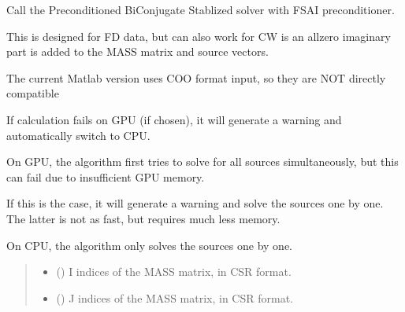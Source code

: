 \documentclass[letterpaper,10pt,english]{sphinxmanual}
\begin{document}
\begin{fulllineitems}
\label{\detokenize{_autosummary/nirfasterff.math.get_field_FD:nirfasterff.math.get_field_FD}}
\pysigstartsignatures
{}
\pysigstopsignatures
\sphinxAtStartPar
Call the Preconditioned BiConjugate Stablized solver with FSAI preconditioner.

\sphinxAtStartPar
This is designed for FD data, but can also work for CW is an all\sphinxhyphen{}zero imaginary part is added to the MASS matrix and source vectors.

\sphinxAtStartPar
The current Matlab version uses COO format input, so they are NOT directly compatible

\sphinxAtStartPar
If calculation fails on GPU (if chosen), it will generate a warning and automatically switch to CPU.

\sphinxAtStartPar
On GPU, the algorithm first tries to solve for all sources simultaneously, but this can fail due to insufficient GPU memory.

\sphinxAtStartPar
If this is the case, it will generate a warning and solve the sources one by one. The latter is not as fast, but requires much less memory.

\sphinxAtStartPar
On CPU, the algorithm only solves the sources one by one.
\begin{quote}\begin{description}
\begin{itemize}
\item {} 
\sphinxAtStartPar
{} (\sphinxstyleliteralemphasis{\sphinxupquote{, }}) \textendash{} I indices of the MASS matrix, in CSR format.

\item {} 
\sphinxAtStartPar
{} (\sphinxstyleliteralemphasis{\sphinxupquote{, }}) \textendash{} J indices of the MASS matrix, in CSR format.


\end{itemize}
\end{description}
\end{quote}
\end{fulllineitems}
\end{document}
